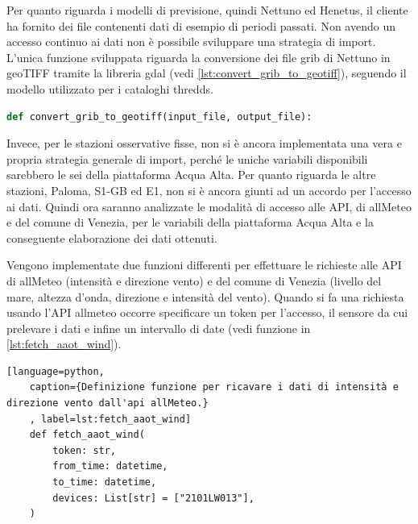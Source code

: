 \documentclass[./main.tex]{subfiles}
\begin{document}
Per quanto riguarda i modelli di previsione, quindi Nettuno ed Henetus, il cliente ha fornito dei file contenenti dati di esempio di periodi passati. Non avendo un accesso continuo ai dati non è possibile sviluppare una strategia di import. L'unica funzione sviluppata riguarda la conversione dei file grib di Nettuno in geoTIFF tramite la libreria gdal (vedi \autoref{lst:convert_grib_to_geotiff}), seguendo il modello utilizzato per i cataloghi thredds.

\begin{lstlisting}[language=Python, 
    caption={Definizione funzione per convertire un file grib in geoTIFF.},
    label=lst:convert_grib_to_geotiff]
def convert_grib_to_geotiff(input_file, output_file):
\end{lstlisting}

Invece, per le stazioni osservative fisse, non si è ancora implementata una vera e propria strategia generale di import, perché le uniche variabili disponibili sarebbero le sei della piattaforma Acqua Alta. Per quanto riguarda le altre stazioni, Paloma, S1-GB ed E1, non si è ancora giunti ad un accordo per l'accesso ai dati. Quindi ora saranno analizzate le modalità di accesso alle API, di allMeteo e del comune di Venezia, per le variabili della piattaforma Acqua Alta e la conseguente elaborazione dei dati ottenuti.

Vengono implementate due funzioni differenti per effettuare le richieste alle API di allMeteo (intensità e direzione vento) e del comune di Venezia (livello del mare, altezza d'onda, direzione e intensità del vento).  Quando si fa una richiesta usando l'API allmeteo occorre specificare un token per l'accesso, il sensore da cui prelevare i dati e infine un intervallo di date (vedi funzione in \autoref{lst:fetch_aaot_wind}). 
\begin{lstlisting}[language=python, 
    caption={Definizione funzione per ricavare i dati di intensità e direzione vento dall'api allMeteo.}
    , label=lst:fetch_aaot_wind]
    def fetch_aaot_wind(
        token: str,
        from_time: datetime,
        to_time: datetime,
        devices: List[str] = ["2101LW013"],
    )
\end{lstlisting}
\end{document}
